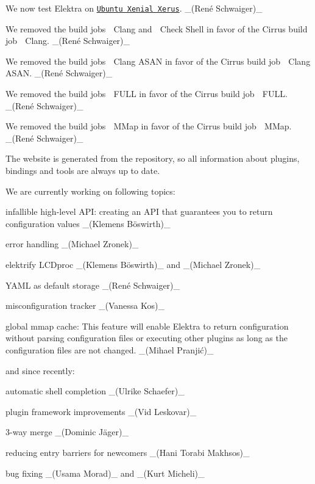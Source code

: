 \begin{DoxyItemize}
\item We now test Elektra on \href{https://docs.travis-ci.com/user/reference/xenial}{\tt Ubuntu Xenial Xerus}. \+\_\+(René Schwaiger)\+\_\+
\item We removed the build jobs {\ttfamily 🍏 Clang} and {\ttfamily 🍏 Check Shell} in favor of the Cirrus build job {\ttfamily 🍎 Clang}. \+\_\+(René Schwaiger)\+\_\+
\item We removed the build jobs {\ttfamily 🍏 Clang A\+S\+AN} in favor of the Cirrus build job {\ttfamily 🍎 Clang A\+S\+AN}. \+\_\+(René Schwaiger)\+\_\+
\item We removed the build jobs {\ttfamily 🍏 F\+U\+LL} in favor of the Cirrus build job {\ttfamily 🍎 F\+U\+LL}. \+\_\+(René Schwaiger)\+\_\+
\item We removed the build jobs {\ttfamily 🍏 M\+Map} in favor of the Cirrus build job {\ttfamily 🍎 M\+Map}. \+\_\+(René Schwaiger)\+\_\+
\end{DoxyItemize}

The website is generated from the repository, so all information about plugins, bindings and tools are always up to date.

We are currently working on following topics\+:


\begin{DoxyItemize}
\item infallible high-\/level A\+PI\+: creating an A\+PI that guarantees you to return configuration values \+\_\+(Klemens Böswirth)\+\_\+
\item error handling \+\_\+(\+Michael Zronek)\+\_\+
\item elektrify L\+C\+Dproc \+\_\+(Klemens Böswirth)\+\_\+ and \+\_\+(\+Michael Zronek)\+\_\+
\item Y\+A\+ML as default storage \+\_\+(René Schwaiger)\+\_\+
\item misconfiguration tracker \+\_\+(\+Vanessa Kos)\+\_\+
\item global mmap cache\+: This feature will enable Elektra to return configuration without parsing configuration files or executing other plugins as long as the configuration files are not changed. \+\_\+(Mihael Pranjić)\+\_\+
\end{DoxyItemize}

and since recently\+:


\begin{DoxyItemize}
\item automatic shell completion \+\_\+(\+Ulrike Schaefer)\+\_\+
\item plugin framework improvements \+\_\+(\+Vid Leskovar)\+\_\+
\item 3-\/way merge \+\_\+(Dominic Jäger)\+\_\+
\item reducing entry barriers for newcomers \+\_\+(\+Hani Torabi Makhsos)\+\_\+
\item bug fixing \+\_\+(\+Usama Morad)\+\_\+ and \+\_\+(\+Kurt Micheli)\+\_\+
\end{DoxyItemize}

